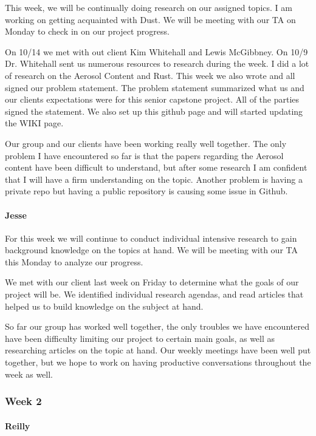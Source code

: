 \documentclass[onecolumn, draftclsnofoot,10pt, compsoc]{IEEEtran}
\begin{document}
\begin{flushleft}
This week, we will be continually doing research on our assigned topics. I am working on getting acquainted with Dust. We will be meeting with our TA on Monday to check in on our project progress.
 
 
On 10/14 we met with out client Kim Whitehall and Lewis McGibbney. On 10/9 Dr. Whitehall sent us numerous resources to research during the week. I did a lot of research on the Aerosol Content and Rust. This week we also wrote and all signed our problem statement. The problem statement summarized what us and our clients expectations were for this senior capstone project. All of the parties signed the statement. We also set up this github page and will started updating the WIKI page.
 
 
Our group and our clients have been working really well together. The only problem I have encountered so far is that the papers regarding the Aerosol content have been difficult to understand, but after some research I am confident that I will have a firm understanding on the topic. Another problem is having a private repo but having a public repository is causing some issue in Github.
 
\paragraph{Jesse}
 
For this week we will continue to conduct individual intensive research to gain background knowledge on the topics at hand. We will be meeting with our TA this Monday to analyze our progress.
 
 
We met with our client last week on Friday to determine what the goals of our project will be. We identified individual research agendas, and read articles that helped us to build knowledge on the subject at hand.
 
 
So far our group has worked well together, the only troubles we have encountered have been difficulty limiting our project to certain main goals, as well as researching articles on the topic at hand. Our weekly meetings have been well put together, but we hope to work on having productive conversations throughout the week as well.
 
\subsubsection{Week 2}
\paragraph{Reilly}
 

\end{flushleft}
\end{document}
